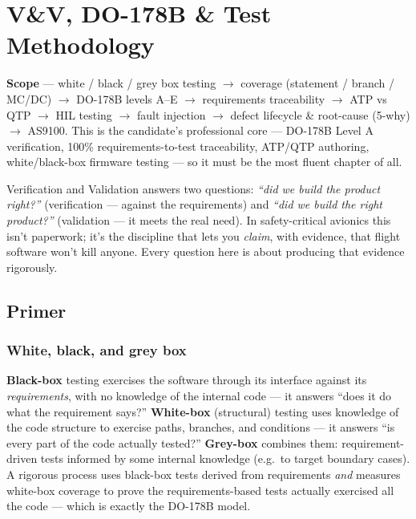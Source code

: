 
\chapter{V\&V, DO-178B \& Test Methodology}
\label{ch:vnv-do178}

\begin{partnote}
\textbf{Scope} --- white / black / grey box testing $\rightarrow$ coverage
(statement / branch / MC/DC) $\rightarrow$ DO-178B levels A--E $\rightarrow$
requirements traceability $\rightarrow$ ATP vs QTP $\rightarrow$ HIL testing
$\rightarrow$ fault injection $\rightarrow$ defect lifecycle \& root-cause
(5-why) $\rightarrow$ AS9100. This is the candidate's professional core ---
DO-178B Level A verification, 100\% requirements-to-test traceability, ATP/QTP
authoring, white/black-box firmware testing --- so it must be the most
fluent chapter of all.
\end{partnote}

Verification and Validation answers two questions: \emph{``did we build the
product right?''} (verification --- against the requirements) and \emph{``did we
build the right product?''} (validation --- it meets the real need). In
safety-critical avionics this isn't paperwork; it's the discipline that lets you
\emph{claim}, with evidence, that flight software won't kill anyone. Every
question here is about producing that evidence rigorously.

\section{Primer}

\subsection{White, black, and grey box}

\textbf{Black-box} testing exercises the software through its interface against
its \emph{requirements}, with no knowledge of the internal code --- it answers
``does it do what the requirement says?'' \textbf{White-box} (structural) testing
uses knowledge of the code structure to exercise paths, branches, and conditions
--- it answers ``is every part of the code actually tested?'' \textbf{Grey-box}
combines them: requirement-driven tests informed by some internal knowledge
(e.g.\ to target boundary cases). A rigorous process uses black-box tests derived
from requirements \emph{and} measures white-box coverage to prove the
requirements-based tests actually exercised all the code --- which is exactly
the DO-178B model.

